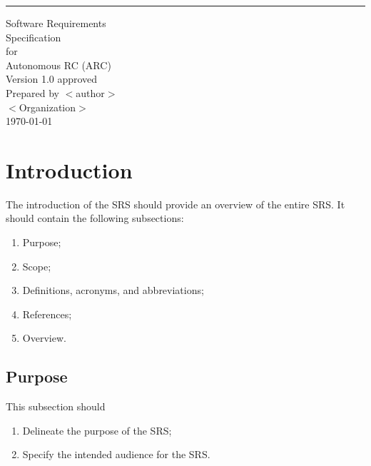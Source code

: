 \documentclass{scrreprt}
\date{}
\def\myversion{1.0 }
\begin{document}
\begin{flushleft}
	\rule{16cm}{5pt}\vskip1cm
	\begin{bfseries}
		\Huge{Software Requirements\\ Specification}\\
		\vspace{1.9cm}
		for\\
		\vspace{1.9cm}
		Autonomous RC (ARC)\\
		\vspace{1.9cm}
		\LARGE{Version \myversion approved}\\
		\vspace{1.9cm}
		Prepared by $<$author$>$\\
		\vspace{1.9cm}
		$<$Organization$>$\\
		\vspace{1.9cm}
		\today\\
	\end{bfseries}
\end{flushleft}

\tableofcontents

\chapter{Introduction}

The introduction of the SRS should provide an overview of the entire SRS. It
should contain the following subsections:
\begin{enumerate}
	\item Purpose;
	\item Scope;
	\item Definitions, acronyms, and abbreviations;
	\item References;
	\item Overview.
\end{enumerate}


\section{Purpose}
This subsection should
\begin{enumerate}
	\item Delineate the purpose of the SRS;
	\item Specify the intended audience for the SRS.
\end{enumerate}
\end{document}
